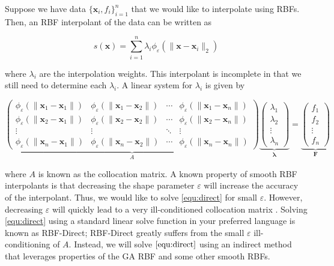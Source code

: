 \documentclass[a4paper,11pt]{article}
\newcommand{\eps}{\varepsilon}
\newcommand{\norm}[1]{\lVert #1 \rVert}
\newcommand{\pmat}[1]{\begin{pmatrix} #1 \end{pmatrix}}
\newcommand{\bx}{\mathbf{x}}
\newcommand{\bF}{\mathbf{F}}
\begin{document}
Suppose we have data $ \{\bx_i, f_i\}_{i = 1}^n $ that we would like to interpolate using RBFs. Then, an RBF interpolant of the data can be written as

\begin{equation}
	s(\bx) = \sum_{i = 1}^n \lambda_i \phi_\eps (\norm{\bx - \bx_i}_2) \label{equ:interp}
\end{equation}

where $ \lambda_i $ are the interpolation weights. This interpolant is incomplete in that we still need to determine each $ \lambda_i $. A linear system for $ \lambda_i $ is given by

\begin{equation}
	\underbrace{\pmat{
			\phi_\eps (\norm{\mathbf{x}_1 - \mathbf{x}_1}) & \phi_\eps (\norm{\mathbf{x}_1 - \mathbf{x}_2}) & \cdots & \phi_\eps (\norm{\mathbf{x}_1 - \mathbf{x}_n}) \\
			\phi_\eps (\norm{\mathbf{x}_2 - \mathbf{x}_1}) & \phi_\eps (\norm{\mathbf{x}_2 - \mathbf{x}_2}) & \cdots & \phi_\eps (\norm{\mathbf{x}_2 - \mathbf{x}_n}) \\
			\vdots & \vdots & \ddots & \vdots \\
			\phi_\eps (\norm{\mathbf{x}_n - \mathbf{x}_1}) & \phi_\eps (\norm{\mathbf{x}_n - \mathbf{x}_2}) & \cdots & \phi_\eps (\norm{\mathbf{x}_n - \mathbf{x}_n})
	}}_{A} \underbrace{\pmat{
			\lambda_1 \\ \lambda_2 \\ \vdots \\ \lambda_n
	}}_{\pmb{\lambda}} = \underbrace{\pmat{
			f_1 \\ f_2 \\ \vdots \\ f_n
	}}_{\bF} \label{equ:direct}
\end{equation}

where $ A $ is known as the collocation matrix. A known property of smooth RBF interpolants is that decreasing the shape parameter $ \eps $ will increase the accuracy of the interpolant. Thus, we would like to solve \eqref{equ:direct} for small $ \eps $. However, decreasing $ \eps $ will quickly lead to a very ill-conditioned collocation matrix \cite{rbf}. Solving \eqref{equ:direct} using a standard linear solve function in your preferred language is known as RBF-Direct; RBF-Direct greatly suffers from the small $ \eps $ ill-conditioning of $ A $. Instead, we will solve $ \eqref{equ:direct} $ using an indirect method that leverages properties of the GA RBF and some other smooth RBFs. 
\end{document}

